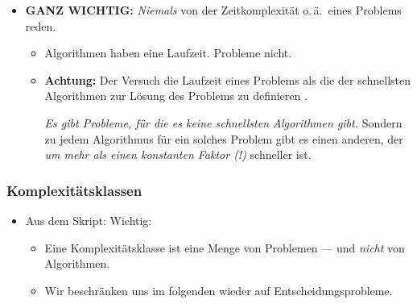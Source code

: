 \documentclass[12pt]{article}
\theoremstyle{margin}
\theoremstyle{margin}
\begin{document}
  \begin{itemize}
  \item \textbf{GANZ WICHTIG:} \emph{Niemals} von der
    Zeitkomplexität o.\,ä.~eines Problems reden.
    \begin{itemize}
    \item Algorithmen haben eine Laufzeit. Probleme nicht.
    \item \textbf{Achtung:} Der Versuch die Laufzeit eines Problems
      als die der schnellsten Algorithmen zur Lösung des Problems zu
      definieren .

      \emph{Es gibt Probleme, für die es keine schnellsten
        Algorithmen gibt.} Sondern zu jedem Algorithmus für ein
      solches Problem gibt es einen anderen, der \emph{um mehr als
        einen konstanten Faktor (!)} schneller ist.
    \end{itemize}
  \end{itemize}

\subsubsection{Komplexit\"atsklassen}

  \begin{itemize}
  \item Aus dem Skript: Wichtig:
    \begin{itemize}
    \item Eine Komplexitätsklasse ist eine Menge von Problemen ---
      und \emph{nicht} von Algorithmen.
    \item Wir beschränken uns im folgenden wieder auf
      Entscheidungsprobleme.
    \end{itemize}
  \end{itemize}
\end{document}
